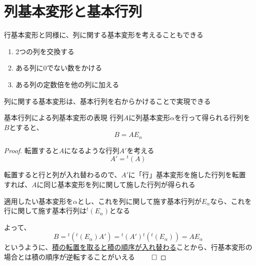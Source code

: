 \documentclass[../../../topic_linear-algebra]{subfiles}
\begin{document}
\sectionline
\section{列基本変形と基本行列}

行基本変形と同様に、列に関する基本変形を考えることもできる

\begin{enumerate}[label=\romanlabel]
  \item 2つの列を交換する
  \item ある列に0でない数をかける
  \item ある列の定数倍を他の列に加える
\end{enumerate}

列に関する基本変形は、基本行列を右からかけることで実現できる

\begin{theorem*}{基本行列による列基本変形の表現}
  行列$A$に列基本変形$\alpha$を行って得られる行列を$B$とすると、
  \begin{equation*}
    B = A E_\alpha
  \end{equation*}
\end{theorem*}

\begin{proof}
  転置すると$A$になるような行列$A'$を考える
  \begin{equation*}
    A' = {}^t(A)
  \end{equation*}

  転置すると行と列が入れ替わるので、$A'$に「行」基本変形を施した行列を転置すれば、$A$に同じ基本変形を列に関して施した行列が得られる

  \br

  適用したい基本変形を$\alpha$とし、これを列に関して施す基本行列が$E_\alpha$なら、これを行に関して施す基本行列は${}^t(E_\alpha)$となる

  \br

  よって、
  \begin{equation*}
    B = {}^t({}^t(E_\alpha)A') = {}^t(A'){}^t({}^t(E_\alpha))  = AE_{\alpha}
  \end{equation*}
  というように、\hyperref[thm:transpose-of-product]{積の転置を取ると積の順序が入れ替わる}ことから、行基本変形の場合とは積の順序が逆転することがいえる $\qed$
\end{proof}
\end{document}
